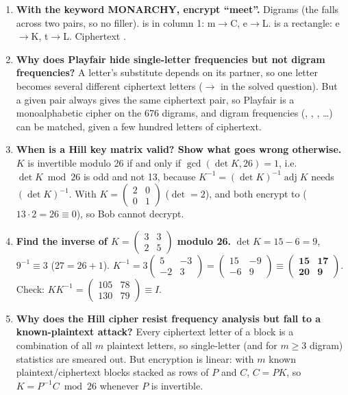 \begin{enumerate}[leftmargin=1.6em,itemsep=3pt]
  \item \textbf{With the keyword MONARCHY, encrypt ``meet''.} Digrams  (the  falls across two pairs, so no filler).  is in column 1: m$\to$C, e$\to$L.  is a rectangle: e$\to$K, t$\to$L. Ciphertext \textbf{}.
  \item \textbf{Why does Playfair hide single-letter frequencies but not digram frequencies?} A letter's substitute depends on its partner, so one letter becomes several different ciphertext letters ($\to$ in the solved question). But a given pair always gives the same ciphertext pair, so Playfair is a monoalphabetic cipher on the 676 digrams, and digram frequencies (, , , \dots) can be matched, given a few hundred letters of ciphertext.
  \item \textbf{When is a Hill key matrix valid? Show what goes wrong otherwise.} $K$ is invertible modulo 26 if and only if $\gcd(\det K, 26) = 1$, i.e.\ $\det K \bmod 26$ is odd and not 13, because $K^{-1} = (\det K)^{-1}\operatorname{adj}K$ needs $(\det K)^{-1}$. With $K = \begin{pmatrix}2&0\\0&1\end{pmatrix}$ ($\det = 2$),  and  both encrypt to  ($13 \cdot 2 = 26 \equiv 0$), so Bob cannot decrypt.
  \item \textbf{Find the inverse of $K = \begin{pmatrix}3&3\\2&5\end{pmatrix}$ modulo 26.} $\det K = 15 - 6 = 9$, $9^{-1} \equiv 3$ ($27 = 26 + 1$). $K^{-1} = 3\begin{pmatrix}5&-3\\-2&3\end{pmatrix} = \begin{pmatrix}15&-9\\-6&9\end{pmatrix} \equiv \mathbf{\begin{pmatrix}15&17\\20&9\end{pmatrix}}$. Check: $KK^{-1} = \begin{pmatrix}105&78\\130&79\end{pmatrix} \equiv I$.
  \item \textbf{Why does the Hill cipher resist frequency analysis but fall to a known-plaintext attack?} Every ciphertext letter of a block is a combination of all $m$ plaintext letters, so single-letter (and for $m \ge 3$ digram) statistics are smeared out. But encryption is linear: with $m$ known plaintext/ciphertext blocks stacked as rows of $P$ and $C$, $C = PK$, so $K = P^{-1}C \bmod 26$ whenever $P$ is invertible.

\end{enumerate}
